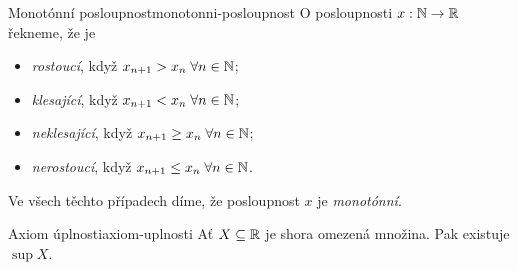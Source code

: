 \begin{definition}{Monotónní posloupnost}{monotonni-posloupnost}
 O posloupnosti $x:\mathbb{N} \to \mathbb{R}$ řekneme, že je
 \begin{itemize}
  \item \emph{rostoucí}, když $x_{n+1}>x_n \; \forall n \in \mathbb{N}$;
  \item \emph{klesající}, když $x_{n+1} < x_n \; \forall n \in \mathbb{N}$;
  \item \emph{neklesající}, když $x_{n+1} \geq x_n \; \forall n \in \mathbb{N}$;
  \item \emph{nerostoucí}, když $x_{n+1} \leq x_n \; \forall n \in \mathbb{N}$.
 \end{itemize}
 Ve všech těchto případech díme, že posloupnost $x$ je \emph{monotónní}.
\end{definition}
\begin{proposition}{Axiom úplnosti}{axiom-uplnosti}
 Ať $X \subseteq \mathbb{R}$ je shora omezená množina. Pak existuje $\sup X$.
\end{proposition}
